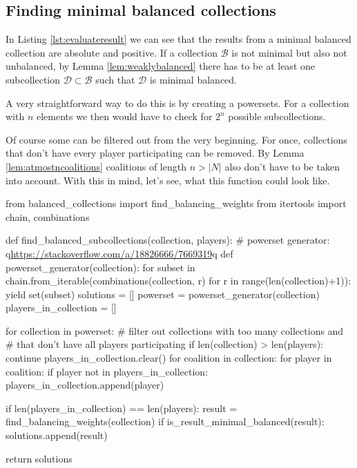 \documentclass[10pt,a4paper,titlepage]{article}
\theoremstyle{plain}
\theoremstyle{definition}
\begin{document}
\subsection{Finding minimal balanced collections}
In Listing \ref{lst:evaluateresult} we can see that the results from a minimal balanced collection are absolute and positive. If a collection $\mathcal{B}$ is not minimal but also not unbalanced, by Lemma \ref{lem:weaklybalanced} there has to be at least one subcollection $\mathcal{D} \subset \mathcal{B}$ such that $\mathcal{D}$ is minimal balanced.

A very straightforward way to do this is by creating a powersets. For a collection with $n$ elements we then would have to check for $2^n$ possible subcollections.

Of course some can be filtered out from the very beginning. For once, collections that don't have every player participating can be removed. By Lemma \ref{lem:atmostncoalitions} coalitions of length $n > |N|$ also don't have to be taken into account. With this in mind, let's see, what this function could look like.

\begin{python}[caption="Find balanced subcollections", escapechar=q]
from balanced_collections import find_balancing_weights
from itertools import chain, combinations

def find_balanced_subcollections(collection, players):
    # powerset generator: q\url{https://stackoverflow.com/a/18826666/7669319}q
    def powerset_generator(collection):
        for subset in chain.from_iterable(combinations(collection, r) for r in range(len(collection)+1)):
            yield set(subset)
    solutions = []
    powerset = powerset_generator(collection)
    players_in_collection = []

    for collection in powerset:
        # filter out collections with too many collections and
        # that don't have all players participating
        if len(collection) > len(players):
            continue
        players_in_collection.clear()
        for coalition in collection:
            for player in coalition:
                if player not in players_in_collection:
                    players_in_collection.append(player)

        if len(players_in_collection) == len(players):
            result = find_balancing_weights(collection)
            if is_result_minimal_balanced(result):
                solutions.append(result)

    return solutions
\end{python}
\end{document}
